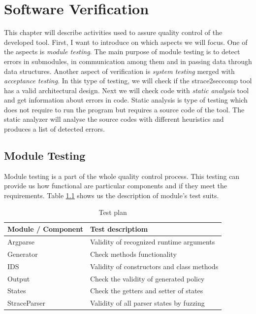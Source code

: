 \chapter{Software Verification}
This chapter will describe activities used to assure quality control of the
developed tool. First, I want to introduce on which aspects we will focus. One
of the aspects is \textit{module testing}. The main purpose of module testing is
to detect errors in submodules, in communication among them and in passing data
through data structures. Another aspect of verification is \textit{system
testing} merged with \textit{acceptance testing}. In this type of testing, we
will check if the strace2seccomp tool has a valid architectural design. Next we
will check code with \textit{static analysis} tool and get information about
errors in code. Static analysis is type of testing which does not require to run
the program but requires a source code of the tool. The static analyzer will
analyse the source codes with different heuristics and produces a list of
detected errors.


\section{Module Testing}
Module testing is a part of the whole quality control process.
This testing can provide us how functional are particular components and if they meet the requirements.
Table \ref{table:moduletesting} shows us the description of module's test suits.

\begin{table}[h]
	\centering
	\begin{tabular}{||l|p{10cm}||}
		\hline
		\textbf{Module / Component}	&	\textbf{Test descriptiom} \\ \hline \hline
		Argparse					& Validity of recognized runtime arguments \\ \hline
		Generator					& Check methods functionality \\ \hline
		IDS							& Validity of constructors and class methods \\ \hline
		Output                      & Check the validity of generated policy \\ \hline
		States						& Check the getters and setter of states \\ \hline
		StraceParser				& Validity of all parser states by fuzzing \\ \hline
	\end{tabular}
	\caption{Test plan}
	\label{table:moduletesting}
\end{table}


